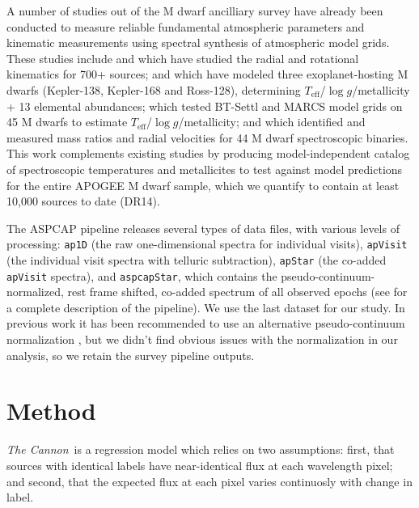 \documentclass[twocolumn]{aastex62}
\newcommand{\thecannon}{\textsl{The Cannon}}
\newcommand{\teff}{T_{\mathrm{eff}}}
\newcommand{\logg}{\log g}
\begin{document}
A number of studies out of the M dwarf ancilliary survey have already been conducted to measure reliable fundamental atmospheric parameters and kinematic measurements using spectral synthesis of atmospheric model grids. 
These studies include \citet{Desphande:2013} and \citet{Gilhool:2018} which have studied the radial and rotational kinematics for 700+ sources;
\citet{Souto:2017} and \citet{Souto:2018} which have modeled three exoplanet-hosting M dwarfs (Kepler-138, Kepler-168 and Ross-128), determining $\teff$/$\logg$/metallicity + 13 elemental abundances;
\citet{Rajpurohit:2018} which tested BT-Settl \citet{Allard:2012} and MARCS \citet{Gustafsson:2008} model grids on 45 M dwarfs to estimate $\teff$/$\logg$/metallicity;
and \citet{Skinner:2018} which identified and measured mass ratios and radial velocities for 44 M dwarf spectroscopic binaries.
This work complements existing studies by producing model-independent catalog of spectroscopic temperatures and metallicites to test against model predictions for the entire APOGEE M dwarf sample, which we quantify to contain at least 10,000 sources to date (DR14).

The ASPCAP pipeline releases several types of data files, with various levels of processing: {\tt\string ap1D} (the raw one-dimensional spectra for individual visits), {\tt\string apVisit} (the individual visit spectra with telluric subtraction), {\tt\string apStar} (the co-added {\tt\string apVisit} spectra), and {\tt\string aspcapStar}, which contains the pseudo-continuum-normalized, rest frame shifted, co-added spectrum of all observed epochs (see \citealt{Perez:2016} for a complete description of the pipeline). We use the last dataset for our study.
In previous work it has been recommended to use an alternative pseudo-continuum normalization \citep{Ness:2015}, but we didn't find obvious issues with the normalization in our analysis, so we retain the survey pipeline outputs.


\section{Method} \label{sec:methods}

\thecannon\ is a regression model which relies on two assumptions: first, that sources with identical labels have near-identical flux at each wavelength pixel; and second, that the expected flux at each pixel varies continuosly with change in label. 
\end{document}
